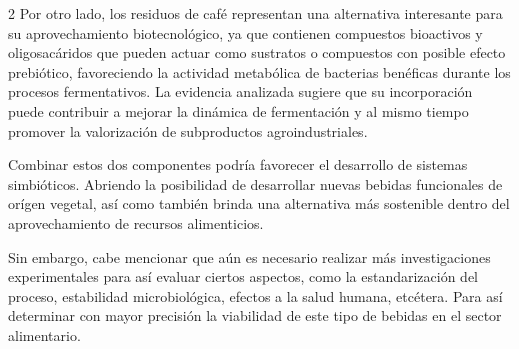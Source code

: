 \begin{multicols}{2}
Por otro lado, los residuos de café representan una alternativa interesante para su aprovechamiento biotecnológico, ya que contienen compuestos bioactivos y oligosacáridos que pueden actuar como sustratos o compuestos con posible efecto prebiótico, favoreciendo la actividad metabólica de bacterias benéficas durante los procesos fermentativos. La evidencia analizada sugiere que su incorporación puede contribuir a mejorar la dinámica de fermentación y al mismo tiempo promover la valorización de subproductos agroindustriales.

Combinar estos dos componentes podría favorecer el desarrollo de sistemas simbióticos. Abriendo la posibilidad de desarrollar nuevas bebidas funcionales de orígen vegetal, así como también brinda una alternativa más sostenible dentro del aprovechamiento de recursos alimenticios.

Sin embargo, cabe mencionar que aún es necesario realizar más investigaciones experimentales para así evaluar ciertos aspectos, como la estandarización del proceso, estabilidad microbiológica, efectos a la salud humana, etcétera. Para así determinar con mayor precisión la viabilidad de este tipo de bebidas en el sector alimentario. 



    
    



\end{multicols}